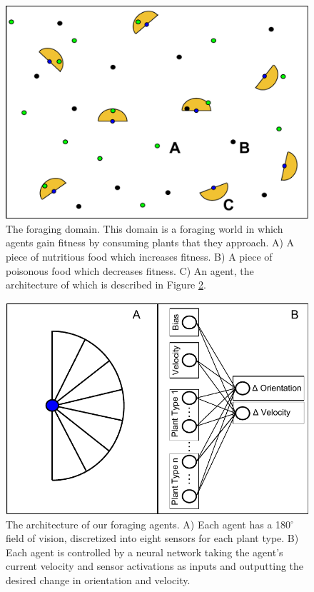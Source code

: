 \documentclass{sig-alternate}
\begin{document}
\begin{figure}[t]
  \centering
    \includegraphics[scale=.333]{world.pdf}
  \caption{The foraging domain. This domain is a foraging world in which agents gain fitness by consuming plants that they approach.  A) A piece of nutritious food which increases fitness. B) A piece of poisonous food which decreases fitness. C) An agent, the architecture of which is described in Figure \ref{fig:agent-architecture}.}
  \label{fig:foraging-world}
\end{figure}
\begin{figure}[t]
  \centering
    \includegraphics[scale=.665]{foraging_agent_architecture.pdf}  \caption{The architecture of our foraging agents. A) Each agent has a 180$^{\circ}$ field of vision, discretized into eight sensors for each plant type. B) Each agent is controlled by a neural network taking the agent's current velocity and sensor activations as inputs and outputting the desired change in orientation and velocity.}
  \label{fig:agent-architecture}
\end{figure}
\end{document}
